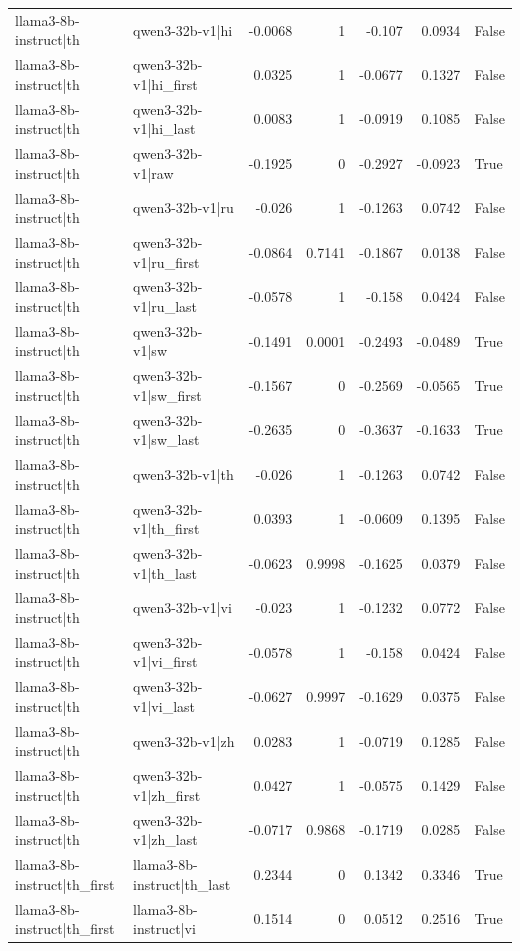 \begin{table}
\begin{tabular}{l l r r r r l}
llama3-8b-instruct|th & qwen3-32b-v1|hi & -0.0068 & 1 & -0.107 & 0.0934 & False \\
llama3-8b-instruct|th & qwen3-32b-v1|hi_first & 0.0325 & 1 & -0.0677 & 0.1327 & False \\
llama3-8b-instruct|th & qwen3-32b-v1|hi_last & 0.0083 & 1 & -0.0919 & 0.1085 & False \\
llama3-8b-instruct|th & qwen3-32b-v1|raw & -0.1925 & 0 & -0.2927 & -0.0923 & True \\
llama3-8b-instruct|th & qwen3-32b-v1|ru & -0.026 & 1 & -0.1263 & 0.0742 & False \\
llama3-8b-instruct|th & qwen3-32b-v1|ru_first & -0.0864 & 0.7141 & -0.1867 & 0.0138 & False \\
llama3-8b-instruct|th & qwen3-32b-v1|ru_last & -0.0578 & 1 & -0.158 & 0.0424 & False \\
llama3-8b-instruct|th & qwen3-32b-v1|sw & -0.1491 & 0.0001 & -0.2493 & -0.0489 & True \\
llama3-8b-instruct|th & qwen3-32b-v1|sw_first & -0.1567 & 0 & -0.2569 & -0.0565 & True \\
llama3-8b-instruct|th & qwen3-32b-v1|sw_last & -0.2635 & 0 & -0.3637 & -0.1633 & True \\
llama3-8b-instruct|th & qwen3-32b-v1|th & -0.026 & 1 & -0.1263 & 0.0742 & False \\
llama3-8b-instruct|th & qwen3-32b-v1|th_first & 0.0393 & 1 & -0.0609 & 0.1395 & False \\
llama3-8b-instruct|th & qwen3-32b-v1|th_last & -0.0623 & 0.9998 & -0.1625 & 0.0379 & False \\
llama3-8b-instruct|th & qwen3-32b-v1|vi & -0.023 & 1 & -0.1232 & 0.0772 & False \\
llama3-8b-instruct|th & qwen3-32b-v1|vi_first & -0.0578 & 1 & -0.158 & 0.0424 & False \\
llama3-8b-instruct|th & qwen3-32b-v1|vi_last & -0.0627 & 0.9997 & -0.1629 & 0.0375 & False \\
llama3-8b-instruct|th & qwen3-32b-v1|zh & 0.0283 & 1 & -0.0719 & 0.1285 & False \\
llama3-8b-instruct|th & qwen3-32b-v1|zh_first & 0.0427 & 1 & -0.0575 & 0.1429 & False \\
llama3-8b-instruct|th & qwen3-32b-v1|zh_last & -0.0717 & 0.9868 & -0.1719 & 0.0285 & False \\
llama3-8b-instruct|th_first & llama3-8b-instruct|th_last & 0.2344 & 0 & 0.1342 & 0.3346 & True \\
llama3-8b-instruct|th_first & llama3-8b-instruct|vi & 0.1514 & 0 & 0.0512 & 0.2516 & True \\

\end{tabular}
\end{table}
